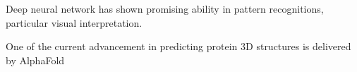 Deep neural network has shown promising ability in pattern recognitions, particular visual interpretation.
\par 


One of the current advancement in predicting protein 3D structures is delivered by AlphaFold